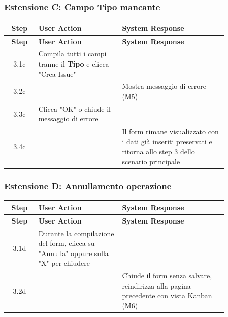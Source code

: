 \newpage
\subsubsection*{Estensione C: Campo Tipo mancante}

\begin{longtable}{|c|p{0.38\linewidth}|p{0.48\linewidth}|}
\hline
\textbf{Step} & \textbf{User Action} & \textbf{System Response} \\ \hline
\endfirsthead

\hline
\textbf{Step} & \textbf{User Action} & \textbf{System Response} \\ \hline
\endhead

\hline
\endfoot

3.1c & Compila tutti i campi tranne il \textbf{Tipo} e clicca "Crea Issue" & \\ \hline

3.2c & & Mostra messaggio di errore (M5) \\ \hline

3.3c & Clicca "OK" o chiude il messaggio di errore & \\ \hline

3.4c & & Il form rimane visualizzato con i dati già inseriti preservati e ritorna allo step 3 dello scenario principale \\ \hline

\end{longtable}

\subsubsection*{Estensione D: Annullamento operazione}

\begin{longtable}{|c|p{0.38\linewidth}|p{0.48\linewidth}|}
\hline
\textbf{Step} & \textbf{User Action} & \textbf{System Response} \\ \hline
\endfirsthead

\hline
\textbf{Step} & \textbf{User Action} & \textbf{System Response} \\ \hline
\endhead

\hline
\endfoot

3.1d & Durante la compilazione del form, clicca su "Annulla" oppure sulla "X" per chiudere & \\ \hline

3.2d & & Chiude il form senza salvare, reindirizza alla pagina precedente con vista Kanban (M6)\\ \hline

\end{longtable}

\newpage